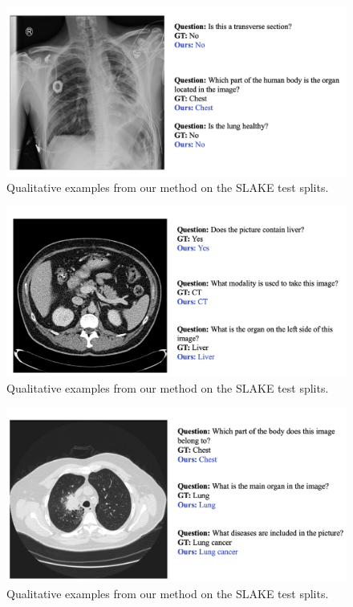 \begin{figure}[t]
\begin{center}
\includegraphics[width=1.0\linewidth]{Chapter_4/chap4_result5.png}
\end{center}
   \caption{Qualitative examples from our method on the SLAKE test splits.
}
\label{fig:qualitative5}
\end{figure}


\begin{figure}[t]
\begin{center}
\includegraphics[width=1.0\linewidth]{Chapter_4/chap4_result6.png}
\end{center}
   \caption{Qualitative examples from our method on the SLAKE test splits.
}
\label{fig:qualitative6}
\end{figure}


\begin{figure}[t]
\begin{center}
\includegraphics[width=1.0\linewidth]{Chapter_4/chap4_result7.png}
\end{center}
   \caption{Qualitative examples from our method on the SLAKE test splits.
}
\label{fig:qualitative7}
\end{figure}

